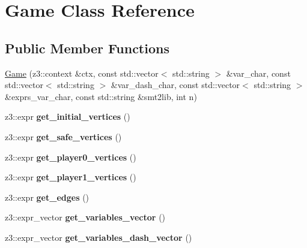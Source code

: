 \hypertarget{classGame}{}\section{Game Class Reference}
\label{classGame}
\subsection*{Public Member Functions}
\begin{DoxyCompactItemize}
\item 
\hyperlink{classGame_a1051ad3ca91f98eade1fe84c68ec721b}{Game} (z3\+::context \&ctx, const std\+::vector$<$ std\+::string $>$ \&var\+\_\+char, const std\+::vector$<$ std\+::string $>$ \&var\+\_\+dash\+\_\+char, const std\+::vector$<$ std\+::string $>$ \&exprs\+\_\+var\+\_\+char, const std\+::string \&smt2lib, int n)
\item 
\mbox{\label{classGame_afd949c6a35db3fbcdc8179756b64508d}} 
z3\+::expr {\bfseries get\+\_\+initial\+\_\+vertices} ()
\item 
\mbox{\label{classGame_aec1f8c4d7631011de0b662d4803f7bf6}} 
z3\+::expr {\bfseries get\+\_\+safe\+\_\+vertices} ()
\item 
\mbox{\label{classGame_a6cfdd0807fa2a55342e5a60da1051973}} 
z3\+::expr {\bfseries get\+\_\+player0\+\_\+vertices} ()
\item 
\mbox{\label{classGame_a46a04d741f3bc1a6d31580248a37368f}} 
z3\+::expr {\bfseries get\+\_\+player1\+\_\+vertices} ()
\item 
\mbox{\label{classGame_a82cc1c9bf325c497538c61a7e75e35e2}} 
z3\+::expr {\bfseries get\+\_\+edges} ()
\item 
\mbox{\label{classGame_af63ba8c0eed410040b262196747602c1}} 
z3\+::expr\+\_\+vector {\bfseries get\+\_\+variables\+\_\+vector} ()
\item 
\mbox{\label{classGame_a4a88d4eb5b82e90a567eb85e87e89b54}} 
z3\+::expr\+\_\+vector {\bfseries get\+\_\+variables\+\_\+dash\+\_\+vector} ()
\item 
\mbox{\label{classGame_a969b1ec48d650af2e79ba26d86ea094b}} 

\end{DoxyCompactItemize}
